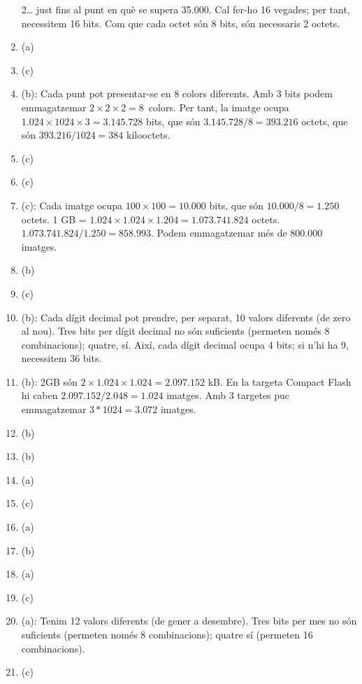 \begin{enumerate}
  2\times\ldots\) just fins al punt en què se supera 35.000. Cal
  fer-ho 16 vegades; per tant, necessitem 16 bits. Com que cada octet
  són 8 bits, són necessaris 2 octets.
\item (a)
\item (c)
\item (b): Cada punt pot presentar-se en 8 colors diferents. Amb 3
  bits podem emmagatzemar \(2\times2\times2=8\)~colors. Per tant, la
  imatge ocupa $1.024 \times 1024 \times 3 = 3.145.728$ bits, que són
  $3.145.728/8=393.216$ octets, que són $393.216/1024=384$
  kilooctets. 
\item (c)
\item (c)
\item (c): Cada imatge ocupa $100\times100 = 10.000$ bits, que són
  $10.000 / 8 = 1.250$ octets. 1 GB = $1.024 \times 1.024 \times 1.204
  = 1.073.741.824 $ octets. $ 1.073.741.824 / 1.250 = 858.993$. Podem
  emmagatzemar més de 800.000 imatges.
\item (b)
\item (c)
\item (b): Cada dígit decimal pot prendre, per separat, 10 valors
  diferents (de zero al nou). Tres bits per dígit decimal no són
  suficients (permeten només 8 combinacions); quatre, sí. Així, cada
  dígit decimal ocupa 4 bits; si n'hi ha 9, necessitem 36 bits.
\item (b): 2GB són $ 2\times 1.024 \times 1.024 = 2.097.152$ kB. En la
  targeta Compact Flash hi caben $ 2.097.152 / 2.048 = 1.024$
  imatges. Amb 3 targetes puc emmagatzemar $ 3 * 1024 = 3.072$
  imatges.
\item (b)
\item (b)
\item (a)
\item (c)
\item (a)
\item (b)
\item (a)
\item (c)
\item (a): Tenim 12 valors diferents (de gener a desembre). Tres bits
  per mes no són suficients (permeten només 8 combinacions); quatre sí
  (permeten 16 combinacions).
\item (c)
\end{enumerate}
